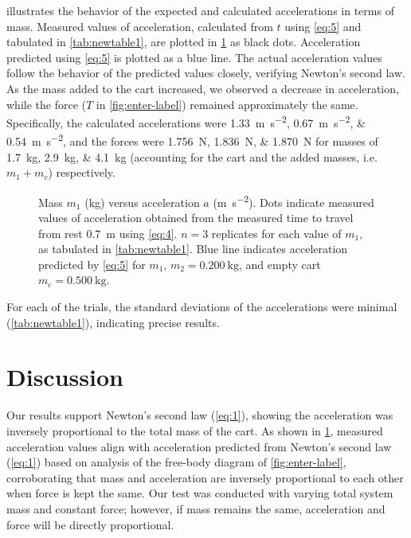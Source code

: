 \documentclass[reprint,amsmath,amssymb,prl]{revtex4-2}
\begin{document}
 illustrates the behavior of the expected and calculated accelerations in terms of mass. Measured values of acceleration, calculated from $t$ using \cref{eq:5} and tabulated in \ref{tab:newtable1}, are plotted in \cref{fig:graph of acceleration} as black dots. Acceleration predicted using \cref{eq:5} is plotted as a blue line. The actual acceleration values follow the behavior of the predicted values closely, verifying Newton's second law. As the mass added to the cart increased, we observed a decrease in acceleration, while the force ($T$ in \cref{fig:enter-label}) remained approximately the same. Specifically, the calculated accelerations were \qtylist{1.33;0.67;0.54}{\meter\per\second\squared}, and the forces were \qtylist{1.756;1.836;1.870}{\newton} for masses of \qtylist{1.7;2.9;4.1}{\kilo\gram} (accounting for the cart and the added masses, i.e. $m_1+m_c$) respectively. 

\begin{figure}[ht] %
\begin{center}

\end{center}
\caption{\label{fig:graph of acceleration} Mass $m_1$ (\unit{\kilo\gram}) versus acceleration $a$ (\unit{\meter\per\second\squared}). Dots indicate measured values of acceleration obtained from the measured time to travel from rest \qty{0.7}{\meter} using \cref{eq:4}. $n=3$ replicates for each value of $m_1$, as tabulated in \cref{tab:newtable1}. Blue line indicates acceleration predicted by \cref{eq:5} for $m_1$, $m_2=\qty{0.200}{\kilo\gram}$, and empty cart $m_c=\qty{0.500}{\kilo\gram}$.}
\end{figure}

For each of the trials, the standard deviations of the accelerations were minimal (\cref{tab:newtable1}), indicating precise results. 





\section{Discussion}
Our results support Newton's second law (\cref{eq:1}), showing the acceleration was inversely proportional to the total mass of the cart. As shown in \cref{fig:graph of acceleration}, measured acceleration values align with acceleration predicted from Newton's second law (\cref{eq:1}) based on analysis of the free-body diagram of \cref{fig:enter-label}, corroborating that mass and acceleration are inversely proportional to each other when force is kept the same. Our test was conducted with varying total system mass and constant force; however, if mass remains the same, acceleration and force will be directly proportional. 
\end{document}
